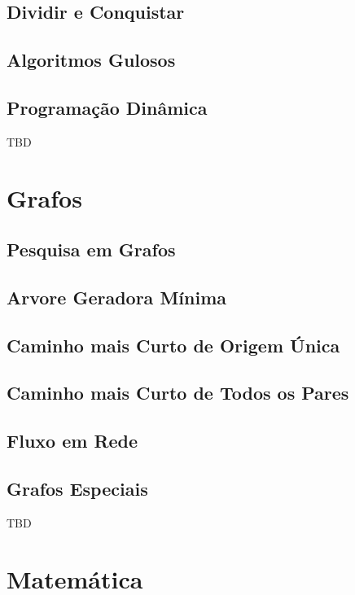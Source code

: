 \documentclass[11pt]{scrartcl}
\begin{document}
\subsection{Dividir e Conquistar}

\subsection{Algoritmos Gulosos}

\subsection{Programação Dinâmica}

TBD


\section{Grafos}

\subsection{Pesquisa em Grafos}

\subsection{Arvore Geradora Mínima}

\subsection{Caminho mais Curto de Origem Única}

\subsection{Caminho mais Curto de Todos os Pares}

\subsection{Fluxo em Rede}

\subsection{Grafos Especiais}

TBD


\section{Matemática}
\end{document}
